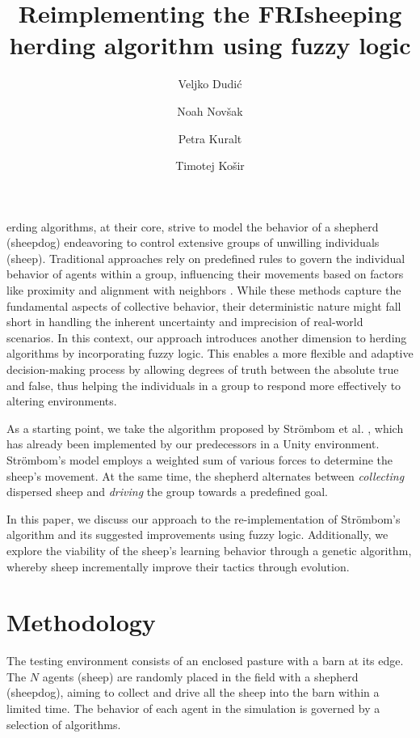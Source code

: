 \documentclass[9pt]{pnas-new}
\title{Reimplementing the FRIsheeping herding algorithm using fuzzy logic}
\author{Veljko Dudić}
\author{Noah Novšak}
\author{Petra Kuralt}
\author{Timotej Košir}
\affil{Collective behavior course research seminar report}
\begin{document}
\verticaladjustment{-2pt}

\maketitle
\thispagestyle{firststyle}

erding algorithms, at their core, strive to model the behavior of a shepherd (sheepdog) endeavoring to control extensive groups of unwilling individuals (sheep).
Traditional approaches rely on predefined rules to govern the individual behavior of agents within a group, influencing their movements based on factors like proximity and alignment with neighbors \cite{basicHerding}. While these methods capture the fundamental aspects of collective behavior, their deterministic nature might fall short in handling the inherent uncertainty and imprecision of real-world scenarios. In this context, our approach introduces another dimension to herding algorithms by incorporating fuzzy logic. This enables a more flexible and adaptive decision-making process by allowing degrees of truth between the absolute true and false, thus helping the individuals in a group to respond more effectively to altering environments.


As a starting point, we take the algorithm proposed by Str\"{o}mbom et al. \cite{strombom}, which has already been implemented by our predecessors in a Unity environment. Str\"{o}mbom's model employs a weighted sum of various forces to determine the sheep's movement. At the same time, the shepherd alternates between \textit{collecting} dispersed sheep and \textit{driving} the group towards a predefined goal.

In this paper, we discuss our approach to the re-implementation of Str\"{o}mbom's algorithm and its suggested improvements using fuzzy logic. Additionally, we explore the viability of the sheep's learning behavior through a genetic algorithm, whereby sheep incrementally improve their tactics through evolution.

\section*{Methodology}
The testing environment consists of an enclosed pasture with a barn at its edge. The $N$ agents (sheep) are randomly placed in the field with a shepherd (sheepdog), aiming to collect and drive all the sheep into the barn within a limited time. The behavior of each agent in the simulation is governed by a selection of algorithms.
\end{document}
